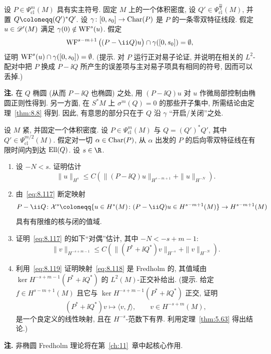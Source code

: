 \begin{exer}[复吸收]\label{ex:8.6}
设 $P \in \Psi_{\mathrm{cl}}^m(M)$ 具有实主符号. 固定 $M$ 上的一个体积密度, 设 $Q' \in \Psi_{\mathrm{cl}}^{\frac{m}{2}}(M)$, 并置 $Q \defeq (Q')^*Q'$. 设 $\gamma \colon [0, s_0] \to \operatorname{Char}(P)$ 是 $P$ 的一条零双特征线段. 假定 $u \in \mathscr{D}'(M)$ 满足 $\gamma(0) \notin \operatorname{WF}^s(u)$. 假定
\begin{equation}\label{eq:8.116}
    \WF^{s-m+1}\big( (P - \ii Q)u \big) \cap \gamma([0, s_0]) = \emptyset,
\end{equation}
证明 $\operatorname{WF}^s(u) \cap \gamma([0, s_0]) = \emptyset$. (提示. 对 $P$ 运行正对易子论证, 并说明在相关的 $L^2$-配对中把 $P$ 换成 $P - \ii Q$ 所产生的误差项与主对易子项具有相同的符号, 因而可以丢掉.)

\smallskip
\noindent\textbf{注.} 在 $Q$ 椭圆 (从而 $P - \ii Q$ 也椭圆) 之处, 用 $(P - \ii Q)u$ 对 $u$ 作微局部控制由椭圆正则性得到. 另一方面, 在 $S^*M$ 上 $\sigma^m(Q) = 0$ 的那些开子集中, 所需结论由定理~\ref{thm:8.8} 得到. 因此, 有意思的部分只在于 $Q$ 沿 $\gamma$ ``开启/关闭''之处.
\end{exer}

\begin{exer}\label{ex:8.7}
设 $M$ 紧, 并固定一个体积密度. 设 $P \in \Psi_{\mathrm{cl}}^m(M)$ 与 $Q = (Q')^*Q'$, 其中 $Q' \in \Psi_{\mathrm{cl}}^{m/2}(M)$. 假定对一切 $\alpha \in \operatorname{Char}(P)$, 从 $\alpha$ 出发的 $P$ 的后向零双特征线在有限时间内到达 $\operatorname{Ell}(Q)$. 设 $s \in \R$.
\begin{enumerate}
    \item 设 $-N < s$. 证明估计
\begin{equation}\label{eq:8.117}
    \| u \|_{H^s} \le C\left( \| (P - \ii Q)u \|_{H^{s-m+1}} + \| u \|_{H^{-N}} \right).
\end{equation}
    \item 由~\eqref{eq:8.117} 断定映射
\begin{equation}\label{eq:8.118}
    P - \ii Q \colon \mathcal{X}^s \defeq \{u \in H^s(M) \colon (P - \ii Q)u \in H^{s-m+1}(M)\} \to H^{s-m+1}(M)
\end{equation}
具有有限维的核与闭的值域.
    \item 证明~\eqref{eq:8.117} 的如下``对偶''估计, 其中 $-N < -s + m - 1$:
\begin{equation}\label{eq:8.119}
    \| v \|_{H^{-s+m-1}} \le C\left( \| (P^* + \ii Q^*)v \|_{H^{-s}} + \| v \|_{H^{-N}} \right).
\end{equation}
    \item 利用~\eqref{eq:8.119} 证明映射~\eqref{eq:8.118} 是 Fredholm 的, 其值域由 $\ker H^{-s+m-1}(P^* + \ii Q^*)$ 的 $L^2(M)$-正交补给出. (提示. 给定 $f \in H^{s-m+1}(M)$ 且它与 $\ker H^{-s+m-1}(P^* + \ii Q^*)$ 正交, 证明
\begin{equation}\label{eq:8.120}
    (P^* + \ii Q^*)v \mapsto \langle v, f \rangle, \qquad v \in H^{-s+m}(M),
\end{equation}
是一个良定义的线性映射, 且在 $H^{-s}$-范数下有界. 利用定理~\ref{thm:5.63} 得出结论.)
\end{enumerate}

\smallskip
\noindent\textbf{注.} 非椭圆 Fredholm 理论将在第~\ref{ch:11}~章中起核心作用.
\end{exer}

